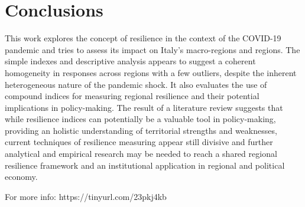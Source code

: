 \documentclass[12pt]{article}
\begin{document}
\section{Conclusions}

This work explores the concept of resilience in the context of the COVID-19 pandemic and tries to assess its impact on Italy's macro-regions and regions. The simple indexes and descriptive analysis appears to suggest a coherent homogeneity in responses across regions with a few outliers, despite the inherent heterogeneous nature of the pandemic shock. It also evaluates the use of compound indices for measuring regional resilience and their potential implications in policy-making. The result of a literature review suggests that while resilience indices can potentially be a valuable tool in policy-making, providing an holistic understanding of territorial strengths and weaknesses, current techniques of resilience measuring appear still divisive and further analytical and empirical research may be needed to reach a shared regional resilience framework and an institutional application in regional and political economy.


\begin{singlespace}
\setlength\bibitemsep{10pt}
\printbibliography
\end{singlespace}

{\footnotesize For more info: https://tinyurl.com/23pkj4kb}
\end{document}
